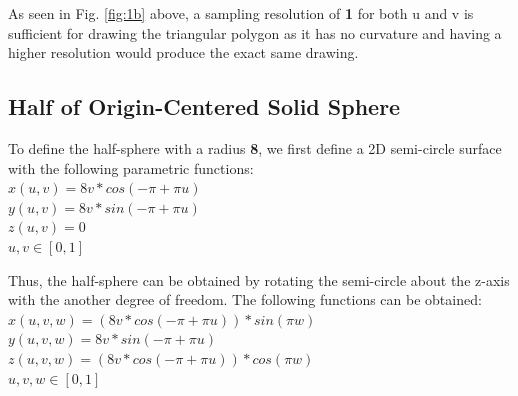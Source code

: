 \documentclass[acmlarge,nonacm=true]{acmart}
\begin{document}
As seen in Fig. \ref{fig:1b} above, a sampling resolution of \textbf{1} for both u and v is 
sufficient for drawing the triangular polygon as it has no curvature and having a higher resolution would
produce the exact same drawing.


\subsection{Half of Origin-Centered Solid Sphere}
\label{section:1c}
To define the half-sphere with a radius \textbf{8}, we first define a 2D semi-circle surface with the following parametric functions:\\
\(x(u,v) = 8v*cos(-\pi + \pi u)\)\\
\(y(u,v) = 8v*sin(-\pi + \pi u)\)\\
\(z(u,v) = 0\)\\
\(u,v \in [0,1]\)

Thus, the half-sphere can be obtained by rotating the semi-circle about the z-axis with the another degree of freedom.
The following functions can be obtained:\\
\(x(u,v,w) = (8v*cos(-\pi + \pi u))*sin(\pi w)\)\\
\(y(u,v,w) = 8v*sin(-\pi + \pi u)\)\\
\(z(u,v,w) = (8v*cos(-\pi + \pi u))*cos(\pi w)\)\\
\(u,v,w \in [0,1]\)
\end{document}
